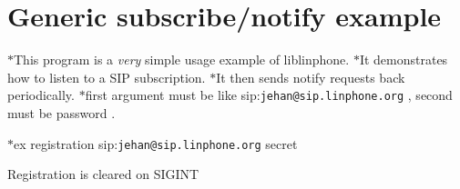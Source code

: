 \section{Generic subscribe/notify example}
\label{group__notify__tutorials}
$\ast$\-This program is a {\itshape very} simple usage example of liblinphone. $\ast$\-It demonstrates how to listen to a S\-I\-P subscription. $\ast$\-It then sends notify requests back periodically. $\ast$first argument must be like sip\-:{\tt jehan@sip.\-linphone.\-org} , second must be password . \par
 $\ast$ex registration sip\-:{\tt jehan@sip.\-linphone.\-org} secret \par
Registration is cleared on S\-I\-G\-I\-N\-T \par
 
